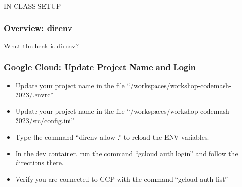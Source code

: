 \documentclass[aspectratio=169]{beamer}
\begin{document}
\begin{frame}
	\Huge \textcolor{dgreen}{IN CLASS SETUP}
\end{frame}
                                                                          


\begin{frame}
	\frametitle{Overview: direnv}
	What the heck is direnv?
\end{frame}

\begin{frame}
	\frametitle{Google Cloud: Update Project Name and Login}
	\begin{itemize}
		\item Update your project name in the file ``/workspaces/workshop-codemash-2023/.envrc''
		\item Update your project name in the file ``/workspaces/workshop-codemash-2023/src/config.ini''
		\item Type the command ``direnv allow .'' to reload the ENV variables.
		\item In the dev container, run the command ``gcloud auth login'' and follow the directions there.
		\item Verify you are connected to GCP with the command ``gcloud auth list''
	\end{itemize}
\end{frame}
\end{document}
